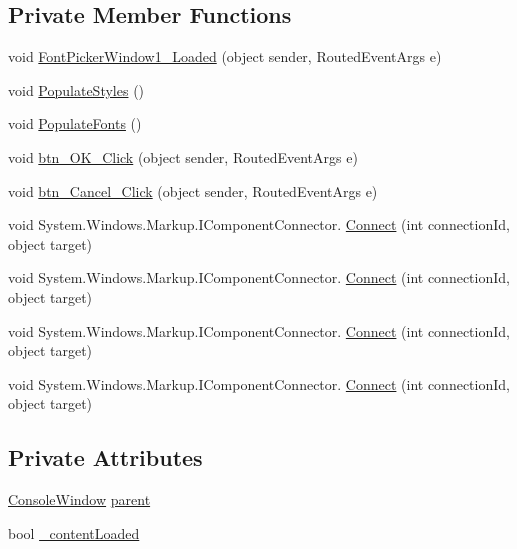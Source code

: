 \subsection*{Private Member Functions}
\begin{DoxyCompactItemize}
\item 
void \hyperlink{class_c_p_u___o_s___simulator_1_1_font_picker_window_a0907f73fb52351e43b76af4137509f41}{Font\+Picker\+Window1\+\_\+\+Loaded} (object sender, Routed\+Event\+Args e)
\item 
void \hyperlink{class_c_p_u___o_s___simulator_1_1_font_picker_window_a79525d7a77c191f63187e5a8181bd197}{Populate\+Styles} ()
\item 
void \hyperlink{class_c_p_u___o_s___simulator_1_1_font_picker_window_a4042c1d9dedbbd9abb956fc7b97c1564}{Populate\+Fonts} ()
\item 
void \hyperlink{class_c_p_u___o_s___simulator_1_1_font_picker_window_a6d659d671c24e1beed969f2d36d669d8}{btn\+\_\+\+O\+K\+\_\+\+Click} (object sender, Routed\+Event\+Args e)
\item 
void \hyperlink{class_c_p_u___o_s___simulator_1_1_font_picker_window_a6e5279d2116523168362cb740eac5e55}{btn\+\_\+\+Cancel\+\_\+\+Click} (object sender, Routed\+Event\+Args e)
\item 
void System.\+Windows.\+Markup.\+I\+Component\+Connector. \hyperlink{class_c_p_u___o_s___simulator_1_1_font_picker_window_ac5f7c5cad6bf2d8dc79c7e59f5a125da}{Connect} (int connection\+Id, object target)
\item 
void System.\+Windows.\+Markup.\+I\+Component\+Connector. \hyperlink{class_c_p_u___o_s___simulator_1_1_font_picker_window_ac5f7c5cad6bf2d8dc79c7e59f5a125da}{Connect} (int connection\+Id, object target)
\item 
void System.\+Windows.\+Markup.\+I\+Component\+Connector. \hyperlink{class_c_p_u___o_s___simulator_1_1_font_picker_window_ac5f7c5cad6bf2d8dc79c7e59f5a125da}{Connect} (int connection\+Id, object target)
\item 
void System.\+Windows.\+Markup.\+I\+Component\+Connector. \hyperlink{class_c_p_u___o_s___simulator_1_1_font_picker_window_ac5f7c5cad6bf2d8dc79c7e59f5a125da}{Connect} (int connection\+Id, object target)
\end{DoxyCompactItemize}
\subsection*{Private Attributes}
\begin{DoxyCompactItemize}
\item 
\hyperlink{class_c_p_u___o_s___simulator_1_1_console_window}{Console\+Window} \hyperlink{class_c_p_u___o_s___simulator_1_1_font_picker_window_a4e59cc593e060f3229adc8decfeb151c}{parent}
\item 
bool \hyperlink{class_c_p_u___o_s___simulator_1_1_font_picker_window_aa37d57c41c80a6fa875193d68754f658}{\+\_\+content\+Loaded}
\end{DoxyCompactItemize}


